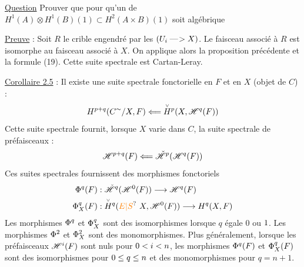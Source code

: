 \uline{Question} Prouver que pour qu'un  de $H^1(A)\otimes H^1(B)(1)\subset H^2(A\times B)(1)$ soit algébrique

\uline{Preuve} : Soit $R$ le crible engendré par les $(U_i\mathrel{\text{---}\!>}X)$. Le faisceau associé à $R$ est isomorphe au faisceau associé à $X$. On applique alors la proposition précédente et la formule (19).
Cette suite spectrale est   Cartan-Leray.

\uline{Corollaire 2.5} : Il existe une suite spectrale fonctorielle en $F$ et en $X$ (objet de $C$) :
\[
 H^{p+q}(C^{\sim}/X,F)\Longleftarrow
 \overset{\scriptscriptstyle\vee}{H}{}^p(X,\mathscr H^q(F))
\]
Cette suite spectrale fournit, lorsque $X$ varie dans $C$, la suite spectrale de préfaisceaux :
\[
 \mathscr H^{p+q}(F)\Longleftarrow
 \check{\mathscr H}^p(\mathscr H^q(F))
\]
Ces suites spectrales fournissent des morphismes fonctoriels \handwritten{:}
\margin{\handwritten{$\unsure{\checkmark}$}}
\[
\begin{aligned}
\handwritten{\Phi}^q(F)&:\handwritten{\check{\mathscr H}}^q(\handwritten{\mathscr H}^0(F))\handwritten{\longrightarrow}\handwritten{\mathscr H}^q(F)\\
\handwritten{\Phi}^q_X(F)&:\overset{\handwritten{\scriptscriptstyle\vee}}{H}{}^q(\unsure{E|S}\ X,\handwritten{\mathscr H}^0(F))\handwritten{\longrightarrow}H^q(X,F)
\end{aligned}
\]
Les morphismes $\Phi^q$ et $\Phi^q_X$ sont des isomorphismes lorsque $q$ égale $0$ ou $1$. Les morphismes $\Phi^2$ et $\Phi^2_X$ sont des monomorphismes. Plus généralement, lorsque les préfaisceaux $\mathscr H^i(F)$ sont nuls pour $0<i<n$, les morphismes $\Phi^q(F)$ et $\Phi^q_X(F)$ sont des isomorphismes pour $0\leq q\leq n$ et des monomorphismes pour $q=n+1$.

